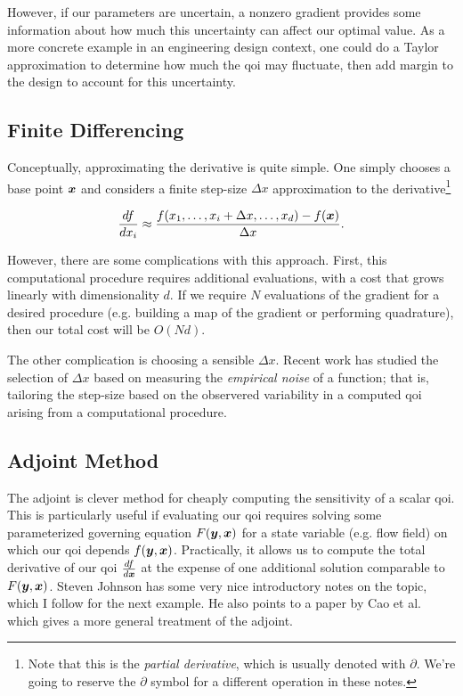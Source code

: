 \documentclass[../primer.tex]{subfiles}
\begin{document}
However, if our parameters are uncertain, a nonzero gradient provides some
information about how much this uncertainty can affect our optimal value. As a
more concrete example in an engineering design context, one could do a Taylor
approximation to determine how much the qoi may fluctuate, then add margin to
the design to account for this uncertainty.

\subsection{Finite Differencing}
\label{sec:org90b543e}
Conceptually, approximating the derivative is quite simple. One simply chooses a
base point \(\boldsymbol{x}\) and considers a finite step-size \(\Delta x\) approximation to
the derivative\footnote{Note that this is the \emph{partial derivative}, which is
usually denoted with \(\partial\). We're going to reserve the \(\partial\) symbol
for a different operation in these notes.}

\begin{equation}
  \frac{df}{dx_i} \approx \frac{f(x_1,\dots,x_i+\Delta x,\dots,x_d) - f(\boldsymbol{x})}{\Delta x}.
\end{equation}

However, there are some complications with this approach. First, this
computational procedure requires additional evaluations, with a cost that grows
linearly with dimensionality \(d\). If we require \(N\) evaluations of the gradient
for a desired procedure (e.g. building a map of the gradient or performing
quadrature), then our total cost will be \(O(Nd)\).

The other complication is choosing a sensible \(\Delta x\). Recent work has
studied the selection of \(\Delta x\) based on measuring the \emph{empirical noise} of
a function; that is, tailoring the step-size based on the observered variability
in a computed qoi arising from a computational procedure.\cite{more2012}

\subsection{Adjoint Method}
\label{sec:org39314ad}
The adjoint is clever method for cheaply computing the sensitivity of a scalar
qoi. This is particularly useful if evaluating our qoi requires solving some
parameterized governing equation \(F(\boldsymbol{y},\boldsymbol{x})\) for a state variable (e.g. flow
field) on which our qoi depends \(f(\boldsymbol{y},\boldsymbol{x})\). Practically, it allows us to
compute the total derivative of our qoi \(\frac{df}{d\boldsymbol{x}}\) at the expense of one
additional solution comparable to \(F(\boldsymbol{y},\boldsymbol{x})\). Steven Johnson \cite{johnson2012}
has some very nice introductory notes on the topic, which I follow for the next
example. He also points to a paper by Cao et al.\cite{cao2003adjoint} which gives
a more general treatment of the adjoint.
\end{document}

